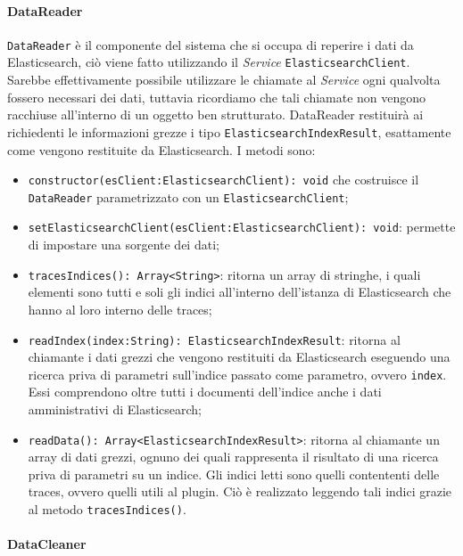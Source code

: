 \paragraph{DataReader} \Spazio
\label{sec:DataReader}
\texttt{DataReader} è il componente del sistema che si occupa di reperire i dati da Elasticsearch, ciò viene fatto utilizzando il \emph{Service} \texttt{ElasticsearchClient}. Sarebbe effettivamente possibile utilizzare le chiamate al \emph{Service} ogni qualvolta fossero necessari dei dati, tuttavia ricordiamo che tali chiamate non vengono racchiuse all'interno di un oggetto ben strutturato. DataReader restituirà ai richiedenti le informazioni grezze i tipo \texttt{ElasticsearchIndexResult}, esattamente come vengono restituite da Elasticsearch. I metodi sono:  

\begin{itemize} 
	\item \texttt{constructor(esClient:ElasticsearchClient): void} che costruisce il \texttt{DataReader} parametrizzato con un \texttt{ElasticsearchClient};
	\item \texttt{setElasticsearchClient(esClient:ElasticsearchClient): void}: permette di impostare una sorgente dei dati;
	\item \texttt{tracesIndices(): Array<String>}: ritorna un array di stringhe, i quali elementi sono tutti e soli gli indici all'interno dell'istanza di Elasticsearch che hanno al loro interno delle traces;
	\item \texttt{readIndex(index:String): ElasticsearchIndexResult}: ritorna al chiamante i dati grezzi che vengono restituiti da Elasticsearch eseguendo una ricerca priva di parametri sull'indice passato come parametro, ovvero \texttt{index}. Essi comprendono oltre tutti i documenti dell'indice anche i dati amministrativi di Elasticsearch;
	\item \texttt{readData(): Array<ElasticsearchIndexResult>}: ritorna al chiamante un array di dati grezzi, ognuno dei quali rappresenta il risultato di una ricerca priva di parametri su un indice. Gli indici letti sono quelli contententi delle traces, ovvero quelli utili al plugin. Ciò è realizzato leggendo tali indici grazie al metodo \texttt{tracesIndices()}.
\end{itemize}



\paragraph{DataCleaner}\Spazio

